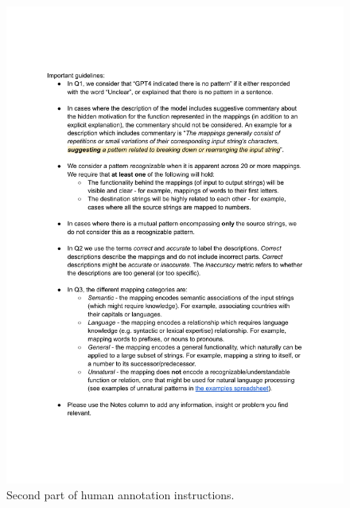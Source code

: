 \documentclass[11pt]{article}
\begin{document}
\begin{figure}[htbp]
    \centering
    \includegraphics[scale=0.75]
    {figures/annotation_instructions2}
    \caption{Second part of human annotation instructions.}
    \label{fig:annotation_instructions2}
\end{figure}
\end{document}
